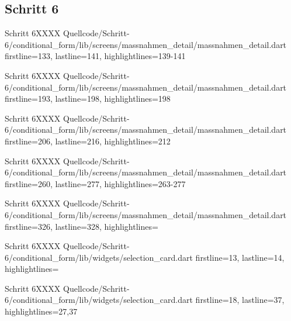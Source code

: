 \clearpage 


\subsection{Schritt 6}


  \begin{alexlisting}{Schritt 6}{XXXX}
    {Quellcode/Schritt-6/conditional_form/lib/screens/massnahmen_detail/massnahmen_detail.dart}
    {firstline=133, lastline=141, highlightlines={139-141}}
    \label{lst:Schritt6XXXXX}
  \end{alexlisting}

  \begin{alexlisting}{Schritt 6}{XXXX}
    {Quellcode/Schritt-6/conditional_form/lib/screens/massnahmen_detail/massnahmen_detail.dart}
    {firstline=193, lastline=198, highlightlines={198}}
    \label{lst:Schritt6XXXXX}
  \end{alexlisting}

  \begin{alexlisting}{Schritt 6}{XXXX}
    {Quellcode/Schritt-6/conditional_form/lib/screens/massnahmen_detail/massnahmen_detail.dart}
    {firstline=206, lastline=216, highlightlines={212}}
    \label{lst:Schritt6XXXXX}
  \end{alexlisting}

  \begin{alexlisting}{Schritt 6}{XXXX}
    {Quellcode/Schritt-6/conditional_form/lib/screens/massnahmen_detail/massnahmen_detail.dart}
    {firstline=260, lastline=277, highlightlines={263-277}}
    \label{lst:Schritt6XXXXX}
  \end{alexlisting}

  \begin{alexlisting}{Schritt 6}{XXXX}
    {Quellcode/Schritt-6/conditional_form/lib/screens/massnahmen_detail/massnahmen_detail.dart}
    {firstline=326, lastline=328, highlightlines={}}
    \label{lst:Schritt6XXXXX}
  \end{alexlisting}


  \begin{alexlisting}{Schritt 6}{XXXX}
    {Quellcode/Schritt-6/conditional_form/lib/widgets/selection_card.dart}
    {firstline=13, lastline=14, highlightlines={}}
    \label{lst:Schritt6XXXX}
\end{alexlisting}

\begin{alexlisting}{Schritt 6}{XXXX}
    {Quellcode/Schritt-6/conditional_form/lib/widgets/selection_card.dart}
    {firstline=18, lastline=37, highlightlines={27,37}}
    \label{lst:Schritt6XXXX}
\end{alexlisting}


